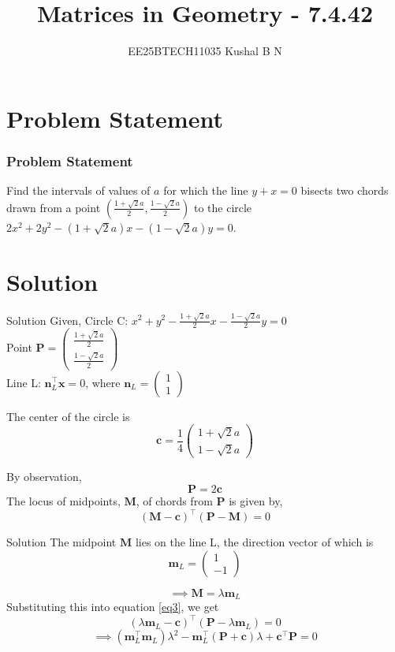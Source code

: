 \documentclass{beamer}
\title{Matrices in Geometry - 7.4.42}
\author{EE25BTECH11035 Kushal B N}
\date{}
\let\vec\mathbf
\providecommand{\brak}[1]{\ensuremath{\left(#1\right)}}
\theoremstyle{remark}
\newcommand{\myvec}[1]{\ensuremath{\begin{pmatrix}#1\end{pmatrix}}}
\begin{document}
\maketitle

\section{Problem Statement}
\begin{frame}
\frametitle{Problem Statement}
Find the intervals of values of $a$ for which the line $y+x = 0$ bisects two chords drawn from a point $\brak{\frac{1+\sqrt{2}a}{2},\frac{1-\sqrt{2}a}{2}}$ to the circle $2x^2 + 2y^2 - (1+\sqrt{2}a)x - (1-\sqrt{2}a)y = 0$.
\end{frame}

\section{Solution}
\begin{frame}{Solution}
Given,
Circle C: $x^2 + y^2 - \frac{1+\sqrt{2}a}{2}x - \frac{1-\sqrt{2}a}{2}y = 0$\\
Point $\vec{P} = \myvec{\frac{1+\sqrt{2}a}{2}\\\frac{1-\sqrt{2}a}{2}}$\\
Line L: $\vec{n}_L^{\top}\vec{x} = 0$, where $\vec{n}_L = \myvec{1\\1}$

The center of the circle is 
\begin{equation}
\vec{c} = \frac{1}{4}\myvec{1+\sqrt{2}a\\1-\sqrt{2}a}
\end{equation}
    
By observation,
\begin{equation}
    \vec{P} = 2\vec{c}
\end{equation}
The locus of midpoints, $\vec{M}$, of chords from $\vec{P}$ is given by,
\begin{equation}
    (\vec{M}-\vec{c})^{\top}(\vec{P}-\vec{M}) = 0
    \label{eq3}
\end{equation}
\end{frame}

\begin{frame}{Solution}
The midpoint $\vec{M}$ lies on the line L, the direction vector of which is
\begin{equation}
    \vec{m}_L = \myvec{1\\-1}
\end{equation}

\begin{equation}
\implies \vec{M} = \lambda\vec{m}_L
\end{equation}
Substituting this into equation \eqref{eq3}, we get
\begin{equation}
    (\lambda\vec{m}_L-\vec{c})^{\top}(\vec{P}-\lambda\vec{m}_L) = 0
\end{equation}
\begin{equation}
    \implies (\vec{m}_L^{\top}\vec{m}_L)\lambda^2 - \vec{m}_L^{\top}(\vec{P}+\vec{c})\lambda + \vec{c}^{\top}\vec{P} = 0
\end{equation}
\end{frame}
\end{document}
